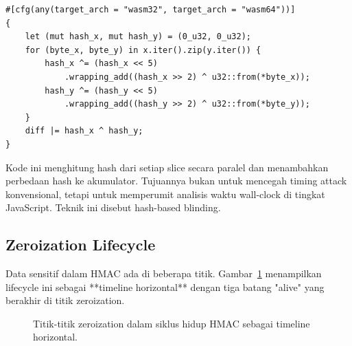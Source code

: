 \documentclass[11pt,a4paper]{article}
\begin{document}
\begin{lstlisting}[style=code]
#[cfg(any(target_arch = "wasm32", target_arch = "wasm64"))]
{
    let (mut hash_x, mut hash_y) = (0_u32, 0_u32);
    for (byte_x, byte_y) in x.iter().zip(y.iter()) {
        hash_x ^= (hash_x << 5)
            .wrapping_add((hash_x >> 2) ^ u32::from(*byte_x));
        hash_y ^= (hash_y << 5)
            .wrapping_add((hash_y >> 2) ^ u32::from(*byte_y));
    }
    diff |= hash_x ^ hash_y;
}
\end{lstlisting}

Kode ini menghitung hash dari setiap slice secara paralel dan menambahkan perbedaan hash ke akumulator. Tujuannya bukan untuk mencegah timing attack konvensional, tetapi untuk memperumit analisis waktu wall-clock di tingkat JavaScript. Teknik ini disebut hash-based blinding.

\subsection{Zeroization Lifecycle}

Data sensitif dalam HMAC ada di beberapa titik. Gambar~\ref{fig:zeroization} menampilkan lifecycle ini sebagai **timeline horizontal** dengan tiga batang "alive" yang berakhir di titik zeroization.

\begin{figure}[H]
	\centering
	\caption{Titik-titik zeroization dalam siklus hidup HMAC sebagai timeline horizontal.}
	\label{fig:zeroization}
\end{figure}
\end{document}
